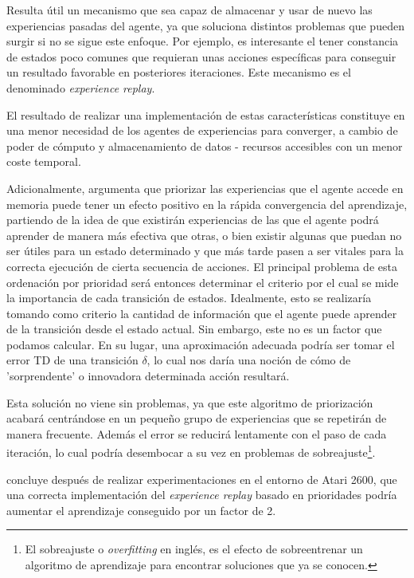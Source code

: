 \documentclass[11pt,spanish,listoffigures,listoftables]{tfgetsinf}
\begin{document}
Resulta útil un mecanismo que sea capaz de almacenar y usar de nuevo las experiencias pasadas del agente, ya que soluciona distintos problemas que pueden surgir si no se sigue este enfoque. Por ejemplo, es interesante el tener constancia de estados poco comunes que requieran unas acciones específicas para conseguir un resultado favorable en posteriores iteraciones. Este mecanismo es el denominado \textit{experience replay}.

El resultado de realizar una implementación de estas características constituye en una menor necesidad de los agentes de experiencias para converger, a cambio de poder de cómputo y almacenamiento de datos - recursos accesibles con un menor coste temporal.

Adicionalmente, \cite{exp_replay_prior} argumenta que priorizar las experiencias que el agente accede en memoria puede tener un efecto positivo en la rápida convergencia del aprendizaje, partiendo de la idea de que existirán experiencias de las que el agente podrá aprender de manera más efectiva que otras, o bien existir algunas que puedan no ser útiles para un estado determinado y que más tarde pasen a ser vitales para la correcta ejecución de cierta secuencia de acciones. El principal problema de esta ordenación por prioridad será entonces determinar el criterio por el cual se mide la importancia de cada transición de estados. Idealmente, esto se realizaría tomando como criterio la cantidad de información que el agente puede aprender de la transición desde el estado actual. Sin embargo, este no es un factor que podamos calcular. En su lugar, una aproximación adecuada podría ser tomar el error TD de una transición $\delta$, lo cual nos daría una noción de cómo de 'sorprendente' o innovadora determinada acción resultará.

Esta solución no viene sin problemas, ya que este algoritmo de priorización acabará centrándose en un pequeño grupo de experiencias que se repetirán de manera frecuente. Además el error se reducirá lentamente con el paso de cada iteración, lo cual podría desembocar a su vez en problemas de sobreajuste\footnote{El sobreajuste o \textit{overfitting} en inglés, es el efecto de sobreentrenar un algoritmo de aprendizaje para encontrar soluciones que ya se conocen.}.

\cite{exp_replay_prior} concluye después de realizar experimentaciones en el entorno de Atari 2600, que una correcta implementación del \textit{experience replay} basado en prioridades podría aumentar el aprendizaje conseguido por un factor de 2.
\end{document}
